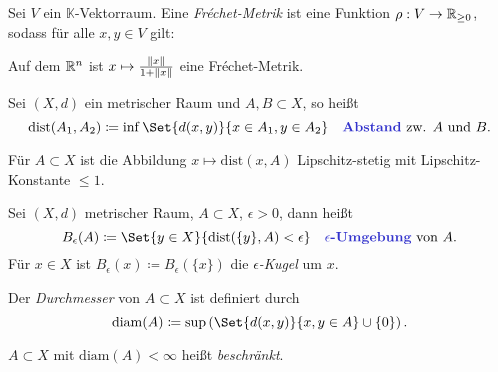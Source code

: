 \documentclass{cheat-sheet}
\newcommand{\K}{\mathbb{K}}
\newcommand{\dist}{\mathrm{dist}} %
\newcommand{\diam}{\mathrm{diam}} %
\begin{document}

\begin{defn}
  Sei $V$ ein $\K$-Vektorraum. Eine \emph{Fréchet-Metrik} ist eine Funktion $\rho : V \to \mathbb{R}_{\geq 0}$, sodass für alle $x, y \in V$ gilt:
  \begin{itemize}
  \end{itemize}
\end{defn}

\begin{bsp}
  Auf dem $\mathbb{R}^n$ ist $x \mapsto \tfrac{\lVert x\rVert}{1 + \lVert x\rVert}$ eine Fréchet-Metrik.
\end{bsp}

\begin{defn}
  Sei $(X, d)$ ein metrischer Raum und $A, B \subset X$, so heißt
  \[ \dist(A_1, A_2) \coloneqq \inf \Set{ d(x,y) }{ x \in A_1, y \in A_2 } \quad \text{\emph{Abstand} zw. $A$ und $B$.} \]
\end{defn}


\begin{bem}
  Für $A \subset X$ ist die Abbildung $x \mapsto \dist(x, A)$ Lipschitz-stetig mit Lipschitz-Konstante $\leq 1$.
\end{bem}

\begin{defn}
  Sei $(X, d)$ metrischer Raum, $A \subset X$, $\epsilon > 0$, dann heißt
  \[ B_\epsilon(A) \coloneqq \Set{ y \in X }{ \dist(\{ y \}, A) < \epsilon} \quad \text{\emph{$\epsilon$-Umgebung} von $A$.} \]
  Für $x \in X$ ist $B_\epsilon(x) \coloneqq B_\epsilon(\{ x \})$ die \emph{$\epsilon$-Kugel} um $x$.
\end{defn}

\begin{defn}
  Der \emph{Durchmesser} von $A \subset X$ ist definiert durch
  \[ \diam(A) \coloneqq \sup \left( \Set{ d(x, y) }{ x, y \in A } \cup \{ 0 \} \right). \]
\end{defn}

\begin{defn}
  $A {\subset} X$ mit $\diam(A) < \infty$ heißt \emph{beschränkt}.
\end{defn}
\end{document}
